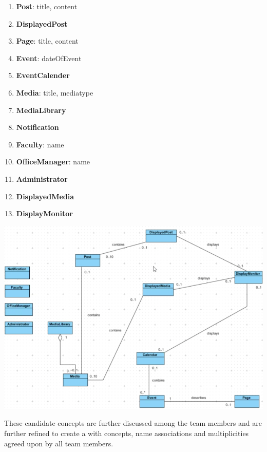 \documentclass{article}
\begin{document}
\begin{minipage}{0.3\textwidth}
    \begin{enumerate}
        \item \textbf{Post}: title, content
        \item \textbf{DisplayedPost}
        \item \textbf{Page}: title, content
        \item \textbf{Event}: dateOfEvent
        \item \textbf{EventCalender}
        \item \textbf{Media}: title, mediatype
        \item \textbf{MediaLibrary}
        \item \textbf{Notification}
        \item \textbf{Faculty}: name
        \item \textbf{OfficeManager}: name
        \item \textbf{Administrator}
        \item \textbf{DisplayedMedia}
        \item \textbf{DisplayMonitor}
    \end{enumerate}
\end{minipage}%
\begin{minipage}{0.7\textwidth}
    \includegraphics[scale=0.52]{images/draft-Concepts.png}
\end{minipage}

These candidate concepts are further discussed among the team members and are further refined to create a  with concepts, name associations and multiplicities agreed upon by all team members.
\end{document}
